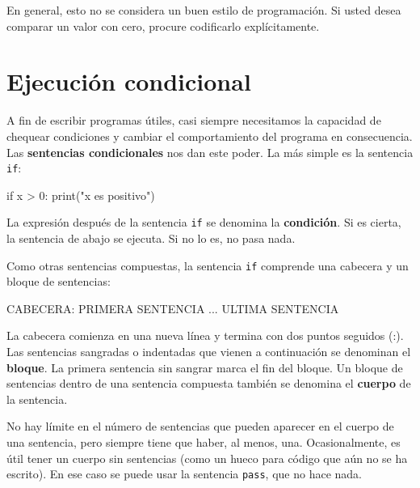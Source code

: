 En general, esto no se considera un buen estilo de programación. Si
usted desea comparar un valor con cero, procure codificarlo explícitamente.

\section{Ejecución condicional}

\label{alternative execution} 

A fin de escribir programas útiles, casi siempre necesitamos la capacidad
de chequear condiciones y cambiar el comportamiento del programa en
consecuencia. Las \textbf{sentencias condicionales} nos dan este poder.
La más simple es la sentencia \texttt{if}: 
\begin{pythoncode}
if x > 0:
  print("x es positivo")
\end{pythoncode}

La expresión después de la sentencia \texttt{if} se denomina la \textbf{condición}.
Si es cierta, la sentencia de abajo se ejecuta. Si no lo es, no pasa
nada.

 
 

Como otras sentencias compuestas, la sentencia \texttt{if} comprende
una cabecera y un bloque de sentencias:
\begin{pythoncode}
CABECERA:
  PRIMERA SENTENCIA
  ...
  ULTIMA SENTENCIA
\end{pythoncode}
La cabecera comienza en una nueva línea y termina con dos puntos seguidos
(:). Las sentencias sangradas o indentadas que vienen a continuación
se denominan el \textbf{bloque}. La primera sentencia sin sangrar
marca el fin del bloque. Un bloque de sentencias dentro de una sentencia
compuesta también se denomina el \textbf{cuerpo} de la sentencia.

  

No hay límite en el número de sentencias que pueden aparecer en el
cuerpo de una sentencia, pero siempre tiene que haber, al menos, una.
Ocasionalmente, es útil tener un cuerpo sin sentencias (como un hueco
para código que aún no se ha escrito). En ese caso se puede usar la
sentencia \texttt{pass}, que no hace nada.

 

